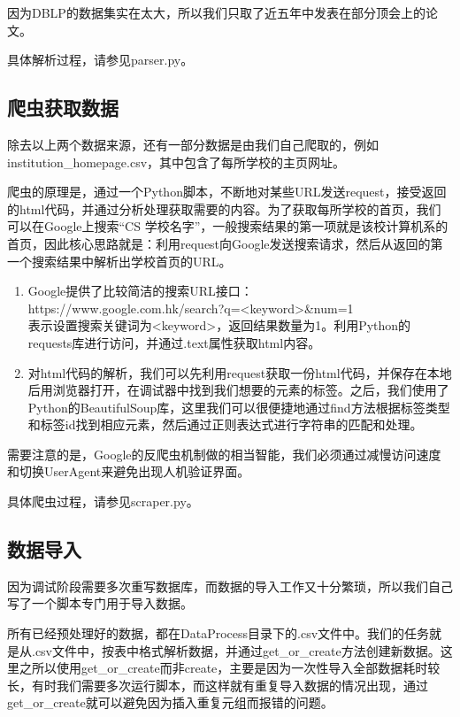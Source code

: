 因为DBLP的数据集实在太大，所以我们只取了近五年中发表在部分顶会上的论文。

具体解析过程，请参见parser.py。

\subsection{爬虫获取数据}

除去以上两个数据来源，还有一部分数据是由我们自己爬取的，例如institution\_homepage.csv，其中包含了每所学校的主页网址。

爬虫的原理是，通过一个Python脚本，不断地对某些URL发送request，接受返回的html代码，并通过分析处理获取需要的内容。为了获取每所学校的首页，我们可以在Google上搜索“CS 学校名字”，一般搜索结果的第一项就是该校计算机系的首页，因此核心思路就是：利用request向Google发送搜索请求，然后从返回的第一个搜索结果中解析出学校首页的URL。
\begin{enumerate}
\item Google提供了比较简洁的搜索URL接口：\\
https://www.google.com.hk/search?q=<keyword>\&num=1\\
表示设置搜索关键词为<keyword>，返回结果数量为1。利用Python的requests库进行访问，并通过.text属性获取html内容。
\item 对html代码的解析，我们可以先利用request获取一份html代码，并保存在本地后用浏览器打开，在调试器中找到我们想要的元素的标签。之后，我们使用了Python的BeautifulSoup库，这里我们可以很便捷地通过find方法根据标签类型和标签id找到相应元素，然后通过正则表达式进行字符串的匹配和处理。
\end{enumerate}

需要注意的是，Google的反爬虫机制做的相当智能，我们必须通过减慢访问速度和切换UserAgent来避免出现人机验证界面。

具体爬虫过程，请参见scraper.py。

\subsection{数据导入}

因为调试阶段需要多次重写数据库，而数据的导入工作又十分繁琐，所以我们自己写了一个脚本专门用于导入数据。

所有已经预处理好的数据，都在DataProcess目录下的.csv文件中。我们的任务就是从.csv文件中，按表中格式解析数据，并通过get\_or\_create方法创建新数据。这里之所以使用get\_or\_create而非create，主要是因为一次性导入全部数据耗时较长，有时我们需要多次运行脚本，而这样就有重复导入数据的情况出现，通过get\_or\_create就可以避免因为插入重复元组而报错的问题。

